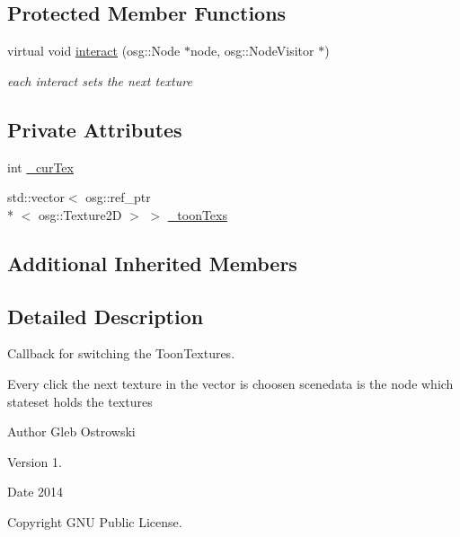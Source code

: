 \subsection*{Protected Member Functions}
\begin{DoxyCompactItemize}
\item 
virtual void \hyperlink{classbrtr_1_1_toon_tex_switcher_callback_a97047bc2817ddfecc2c1531d22e289fd}{interact} (osg\+::\+Node $\ast$node, osg\+::\+Node\+Visitor $\ast$)
\begin{DoxyCompactList}\small\item\em each interact sets the next texture \end{DoxyCompactList}\end{DoxyCompactItemize}
\subsection*{Private Attributes}
\begin{DoxyCompactItemize}
\item 
int \hyperlink{classbrtr_1_1_toon_tex_switcher_callback_a58030dcd246f0f2c168965ca087cfa17}{\+\_\+cur\+Tex}
\item 
std\+::vector$<$ osg\+::ref\+\_\+ptr\\*
$<$ osg\+::\+Texture2\+D $>$ $>$ \hyperlink{classbrtr_1_1_toon_tex_switcher_callback_a96cbd2a83f9ed21efde9d086c34e6d5e}{\+\_\+toon\+Texs}
\end{DoxyCompactItemize}
\subsection*{Additional Inherited Members}


\subsection{Detailed Description}
Callback for switching the Toon\+Textures. 

Every click the next texture in the vector is choosen scenedata is the node which stateset holds the textures \begin{DoxyAuthor}{Author}
Gleb Ostrowski 
\end{DoxyAuthor}
\begin{DoxyVersion}{Version}
1. 
\end{DoxyVersion}
\begin{DoxyDate}{Date}
2014 
\end{DoxyDate}
\begin{DoxyCopyright}{Copyright}
G\+N\+U Public License. 
\end{DoxyCopyright}


